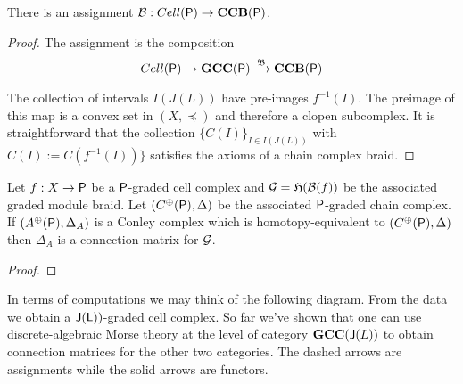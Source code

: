 \begin{prop}
There is an assignment ${\mathcal B}:Cell({\mathsf P})\to {\bf CCB}({\mathsf P})$.
\end{prop}
\begin{proof}

The assignment is the composition $$Cell({\mathsf P})\to {\bf GCC({\mathsf P})} \xrightarrow{\mathfrak{B}} {\bf CCB}({\mathsf P})$$


The collection of intervals $I(J(L))$ have pre-images $f^{-1}(I)$.  The preimage of this map is a convex set in $(X,\preceq)$ and therefore a clopen subcomplex.   It is straightforward that the collection $\{C(I)\}_{I\in I(J(L))}$ with $C(I) := C(f^{-1}(I))\}$ satisfies the axioms of a chain complex braid. 
\end{proof}





\begin{thm}
Let $f:X\to {\mathsf P}$ be a ${\mathsf P}$-graded cell complex and ${\mathcal G} = \mathfrak{H}({\mathcal B}(f))$ be the associated graded module braid.  Let $(C^\oplus({\mathsf P}),\Delta)$ be the associated ${\mathsf P}$-graded chain complex.  If $(A^\oplus({\mathsf P}),\Delta_A)$ is a Conley complex which is homotopy-equivalent to $(C^\oplus({\mathsf P}),\Delta)$ then $\Delta_A$ is a connection matrix for ${\mathcal G}$.
\end{thm}
\begin{proof}




%
% 
% 
% 

\end{proof}


In terms of computations we may think of the following diagram.  From the data we obtain a ${\mathsf J}({\mathsf L}))$-graded cell complex.  So far we've shown that one can use discrete-algebraic Morse theory at the level of category ${\bf GCC}({\mathsf J}(L))$ to obtain connection matrices for the other two categories.  The dashed arrows are assignments while the solid arrows are functors.

